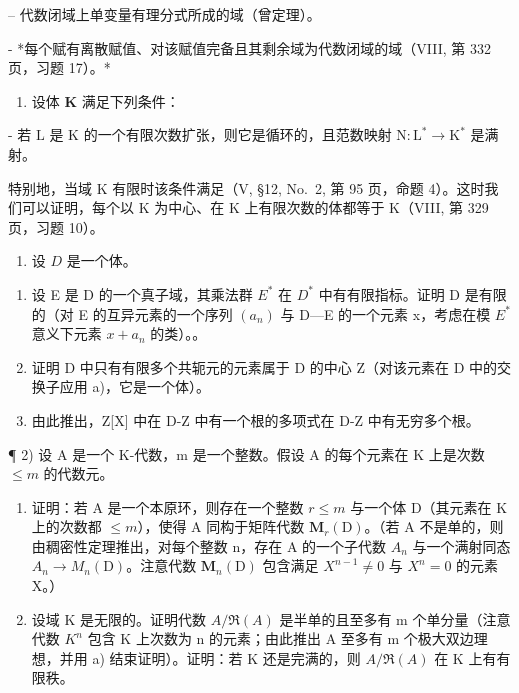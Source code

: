 -- 代数闭域上单变量有理分式所成的域（曾定理）。

- *每个赋有离散赋值、对该赋值完备且其剩余域为代数闭域的域（VIII, 第 332 页，习题 17）。*

\begin{enumerate}
\def\labelenumi{\arabic{enumi})}
\setcounter{enumi}{2}
\tightlist
\item
  设体 \(\mathbf{K}\) 满足下列条件：
\end{enumerate}

- 若 \(\mathrm{L}\) 是 \(\mathrm{K}\) 的一个有限次数扩张，则它是循环的，且范数映射 \(\mathrm{N}:\mathrm{L}^{*}\to \mathrm{K}^{*}\) 是满射。

特别地，当域 K 有限时该条件满足（V, §12, No.~2, 第 95 页，命题 4）。这时我们可以证明，每个以 K 为中心、在 K 上有限次数的体都等于 K（VIII, 第 329 页，习题 10）。


\begin{enumerate}
\def\labelenumi{\arabic{enumi})}
\tightlist
\item
  设 \(D\) 是一个体。
\end{enumerate}

\begin{enumerate}
\def\labelenumi{\alph{enumi})}
\item
  设 E 是 D 的一个真子域，其乘法群 \(E^{*}\) 在 \(D^{*}\) 中有有限指标。证明 D 是有限的（对 E 的互异元素的一个序列 \((a_{n})\) 与 D---E 的一个元素 x，考虑在模 \(E^{*}\) 意义下元素 \(x + a_{n}\) 的类）。。
\item
  证明 D 中只有有限多个共轭元的元素属于 D 的中心 Z（对该元素在 D 中的交换子应用 a)，它是一个体）。
\item
  由此推出，Z{[}X{]} 中在 D-Z 中有一个根的多项式在 D-Z 中有无穷多个根。
\end{enumerate}

¶ 2) 设 A 是一个 K-代数，m 是一个整数。假设 A 的每个元素在 K 上是次数 \(\leqslant m\) 的代数元。

\begin{enumerate}
\def\labelenumi{\alph{enumi})}
\item
  证明：若 A 是一个本原环，则存在一个整数 \(r \leqslant m\) 与一个体 D（其元素在 K 上的次数都 \(\leqslant m\)），使得 A 同构于矩阵代数 \(\mathbf{M}_{r}(\mathrm{D})\)。（若 A 不是单的，则由稠密性定理推出，对每个整数 n，存在 A 的一个子代数 \(A_{n}\) 与一个满射同态 \(A_{n} \to M_{n}(\mathrm{D})\)。注意代数 \(\mathbf{M}_{n}(\mathrm{D})\) 包含满足 \(X^{n-1} \neq 0\) 与 \(X^{n} = 0\) 的元素 X。）
\item
  设域 K 是无限的。证明代数 \(A/\Re(A)\) 是半单的且至多有 m 个单分量（注意代数 \(K^{n}\) 包含 K 上次数为 n 的元素；由此推出 A 至多有 m 个极大双边理想，并用 a) 结束证明）。证明：若 K 还是完满的，则 \(A/\Re(A)\) 在 K 上有有限秩。
\end{enumerate}

